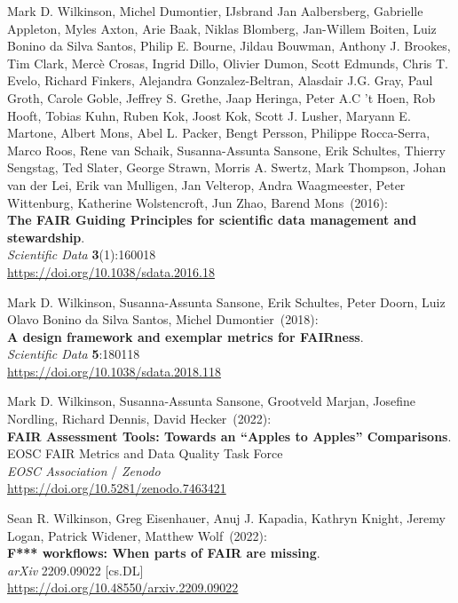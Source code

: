 \begin{thebibliography}{9}
Mark D. Wilkinson, Michel Dumontier, IJsbrand Jan Aalbersberg, Gabrielle Appleton, Myles Axton, Arie Baak, Niklas Blomberg, Jan-Willem Boiten, Luiz Bonino da Silva Santos, Philip E. Bourne, Jildau Bouwman, Anthony J. Brookes, Tim Clark, Mercè Crosas, Ingrid Dillo, Olivier Dumon, Scott Edmunds, Chris T. Evelo, Richard Finkers, Alejandra Gonzalez-Beltran, Alasdair J.G. Gray, Paul Groth, Carole Goble, Jeffrey S. Grethe, Jaap Heringa, Peter A.C 't Hoen, Rob Hooft, Tobias Kuhn, Ruben Kok, Joost Kok, Scott J. Lusher, Maryann E. Martone, Albert Mons, Abel L. Packer, Bengt Persson, Philippe Rocca-Serra, Marco Roos, Rene van Schaik, Susanna-Assunta Sansone, Erik Schultes, Thierry Sengstag, Ted Slater, George Strawn, Morris A. Swertz, Mark Thompson, Johan van der Lei, Erik van Mulligen, Jan Velterop, Andra Waagmeester, Peter Wittenburg, Katherine Wolstencroft, Jun Zhao, Barend Mons~(2016): \\
\textbf{The FAIR Guiding Principles for scientific data management and stewardship}.\\
\emph{Scientific Data} \textbf{3}(1):160018\\
\url{https://doi.org/10.1038/sdata.2016.18}

Mark D. Wilkinson, Susanna-Assunta Sansone, Erik Schultes, Peter Doorn, Luiz Olavo Bonino da Silva Santos, Michel Dumontier~(2018): \\
\textbf{A design framework and exemplar metrics for FAIRness}.\\
\emph{Scientific Data} \textbf{5}:180118 \\
\url{https://doi.org/10.1038/sdata.2018.118}

Mark D. Wilkinson, Susanna-Assunta Sansone, Grootveld Marjan, Josefine Nordling, Richard Dennis, David Hecker~(2022): \\
\textbf{FAIR Assessment Tools: Towards an “Apples to Apples” Comparisons}.\\ 
EOSC FAIR Metrics and Data Quality Task Force\\
\emph{EOSC Association} / \emph{Zenodo}\\
\url{https://doi.org/10.5281/zenodo.7463421}

Sean R. Wilkinson, Greg Eisenhauer, Anuj J. Kapadia, Kathryn Knight, Jeremy Logan, Patrick Widener, Matthew Wolf~(2022): \\
\textbf{F*** workflows: When parts of {FAIR} are missing}. \\
\emph{arXiv} 2209.09022 [cs.DL] \\
\url{https://doi.org/10.48550/arxiv.2209.09022}


\end{thebibliography}
